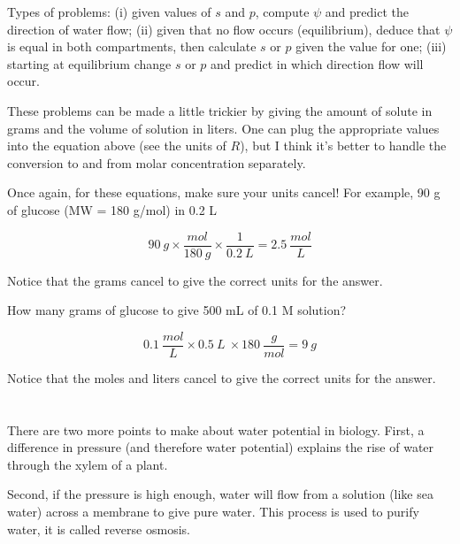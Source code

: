 \documentclass[11pt, oneside]{article}   	%
\begin{document}
Types of problems:  (i) given values of $s$ and $p$, compute $\psi$ and predict the direction of water flow;  (ii) given that no flow occurs (equilibrium), deduce that $\psi$ is equal in both compartments, then calculate $s$ or $p$ given the value for one;  (iii) starting at equilibrium change $s$ or $p$ and predict in which direction flow will occur.

These problems can be made a little trickier by giving the amount of solute in grams and the volume of solution in liters.  One can plug the appropriate values into the equation above (see the units of $R$), but I think it's better to handle the conversion to and from molar concentration separately.

Once again, for these equations, make sure your units cancel!  For example, 90 g of glucose (MW = 180 g/mol) in 0.2 L

\[ 90 \ g \times \frac{mol}{180 \ g} \times \frac{1}{0.2 \ L} = 2.5 \ \frac{mol}{L} \]

Notice that the grams cancel to give the correct units for the answer.

How many grams of glucose to give 500 mL of 0.1 M solution?

\[ 0.1 \ \frac{mol}{L} \times 0.5 \ L\ \times 180 \ \frac{g}{mol} = 9 \ g \]

Notice that the moles and liters cancel to give the correct units for the answer.

\section*{}
There are two more points to make about water potential in biology.  First, a difference in pressure (and therefore water potential) explains the rise of water through the xylem of a plant.

Second, if the pressure is high enough, water will flow from a solution (like sea water) across a membrane to give pure water.  This process is used to purify water, it is called reverse osmosis. 
\end{document}
